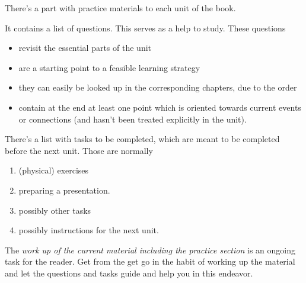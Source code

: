 \documentclass[../main.tex]{subfiles}
\begin{document}
There's a part with practice materials to each unit of the book. %

It contains a list of questions. This serves as a help to study. These questions
\begin{itemize}
\item revisit the essential parts of the unit
\item are a starting point to a feasible learning strategy
\item they can easily be looked up in the corresponding chapters, due to the order
\item contain at the end at least one point which is oriented towards current events or connections
  (and hasn't been treated explicitly in the unit).
\end{itemize}

\noindent There's a list with tasks to be completed, which are meant to be completed before the next unit.
Those are normally
\begin{enumerate}[label = \Alph*]
\item (physical) exercises
\item preparing a presentation.
\item possibly other tasks
  \item possibly instructions for the next unit. %
\end{enumerate}


\noindent The \emph{work up of the current material including the practice section} is an ongoing task for the reader.
Get from the get go in the habit of working up the material and let the questions and tasks guide and help you in this endeavor.
\end{document}
